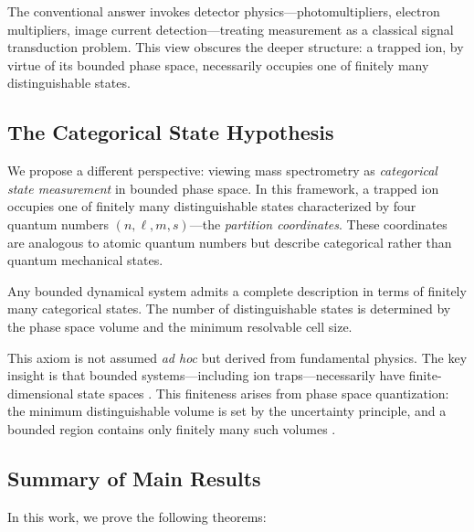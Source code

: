The conventional answer invokes detector physics---photomultipliers, electron multipliers, image current detection---treating measurement as a classical signal transduction problem. This view obscures the deeper structure: a trapped ion, by virtue of its bounded phase space, necessarily occupies one of finitely many distinguishable states.

\subsection{The Categorical State Hypothesis}

We propose a different perspective: viewing mass spectrometry as \emph{categorical state measurement} in bounded phase space. In this framework, a trapped ion occupies one of finitely many distinguishable states characterized by four quantum numbers $(n, \ell, m, s)$---the \emph{partition coordinates}. These coordinates are analogous to atomic quantum numbers but describe categorical rather than quantum mechanical states.

\begin{axiom}
\label{axiom:categorical}
Any bounded dynamical system admits a complete description in terms of finitely many categorical states. The number of distinguishable states is determined by the phase space volume and the minimum resolvable cell size.
\end{axiom}

This axiom is not assumed \textit{ad hoc} but derived from fundamental physics. The key insight is that bounded systems---including ion traps---necessarily have finite-dimensional state spaces \citep{landau1980statistical}. This finiteness arises from phase space quantization: the minimum distinguishable volume is set by the uncertainty principle, and a bounded region contains only finitely many such volumes \citep{liouville1838note}.

\subsection{Summary of Main Results}

In this work, we prove the following theorems:

